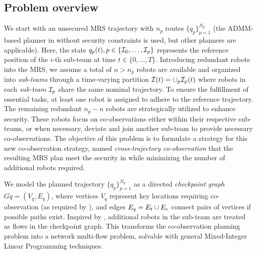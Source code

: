 \documentclass[10pt,twocolumn,twoside]{IEEEtran}
\begin{document}
\subsection{Problem overview}
We start with an unsecured MRS trajectory with $n_p$ routes $\{q_p\}_{p=1}^{N_p}$ (the ADMM-based planner in  without security constraints is used, but other planners are applicable). Here, the state $q_p(t), p \in\{\mathcal{I}_0,\ldots,\mathcal{I}_{p}\}$ represents the reference position of the $i$-th sub-team at time $t\in\{0, \dots, T\}$. Introducing redundant robots into the MRS, we assume a total of $n > n_p$ robots are available and organized into \emph{sub-teams} through a time-varying partition $\mathcal{I}(t)=\cup_p \mathcal{I}_p(t)$ where robots in each \emph{sub-team} $\mathcal{I}_p$ share the same nominal trajectory. To ensure the fulfillment of essential tasks, at least one robot is assigned to adhere to the reference trajectory. The remaining redundant $n_p-n$ robots are strategically utilized to enhance security. These robots focus on co-observations either within their respective sub-teams, or when necessary, deviate and join another sub-team to provide necessary co-observations. The objective of this problem is to formulate a strategy for this new co-observation strategy, named \emph{cross-trajectory co-observation} that the resulting MRS plan meet the security in  while minimizing the number of additional robots required. 

We model the planned trajectory $\{q_p\}_{p=1}^{N_p}$ as a directed \emph{checkpoint graph} $G{q}=(V_{q}, E_{q})$, where vertices $V_{q}$ represent key locations requiring co-observation (as required by ), and edges $E_{q} = E_{t} \cup E_{c}$ connect pairs of vertices if possible paths exist. Inspired by \cite{yu2013multi}, additional robots in the sub-team are treated as flows in the checkpoint graph. This transforms the co-observation planning problem into a network multi-flow problem, solvable with general Mixed-Integer Linear Programming techniques.

\end{document}
